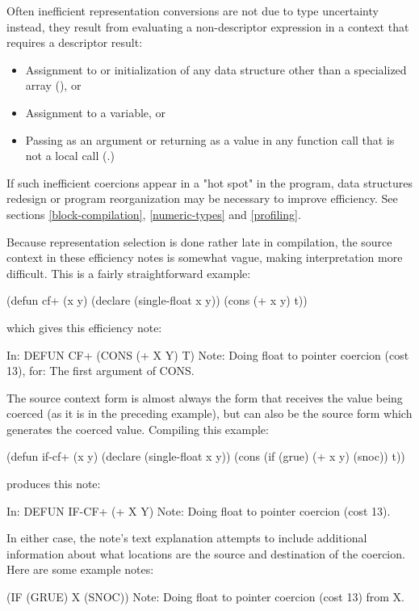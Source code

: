 {Often inefficient representation conversions are not due to type uncertainty
\dash{} instead, they result from evaluating a non-descriptor expression in a
context that requires a descriptor result:
\begin{itemize}

\item
Assignment to or initialization of any data structure other than a specialized
array (), or

\item
Assignment to a  variable, or

\item
Passing as an argument or returning as a value in any function call that is not
a local call (.)
\end{itemize}

If such inefficient coercions appear in a "hot spot" in the program, data
structures redesign or program reorganization may be necessary to improve
efficiency.  See sections \ref{block-compilation}, \ref{numeric-types} and
\ref{profiling}.

Because representation selection is done rather late in compilation, the source
context in these efficiency notes is somewhat vague, making interpretation more
difficult.  This is a fairly straightforward example:
\begin{lisp}
(defun cf+ (x y)
  (declare (single-float x y))
  (cons (+ x y) t))
\end{lisp}
which gives this efficiency note:
\begin{example}
In: DEFUN CF+
  (CONS (+ X Y) T)
Note: Doing float to pointer coercion (cost 13), for:
      The first argument of CONS.
\end{example}
The source context form is almost always the form that receives the value being
coerced (as it is in the preceding example), but can also be the source form
which generates the coerced value.  Compiling this example:
\begin{lisp}
(defun if-cf+ (x y)
  (declare (single-float x y))
  (cons (if (grue) (+ x y) (snoc)) t))
\end{lisp}
produces this note:
\begin{example}
In: DEFUN IF-CF+
  (+ X Y)
Note: Doing float to pointer coercion (cost 13).
\end{example}

In either case, the note's text explanation attempts to include additional
information about what locations are the source and destination of the
coercion.  Here are some example notes:
\begin{example}
  (IF (GRUE) X (SNOC))
Note: Doing float to pointer coercion (cost 13) from X.


\end{example}}
